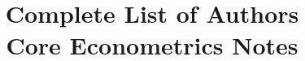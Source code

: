 \documentclass[nohyper]{tufte-handout}
\title[Complete list of authors]%
{Complete List of Authors \\
  Core Econometrics Notes}
\begin{document}
\maketitle
\bigskip

\end{document}
